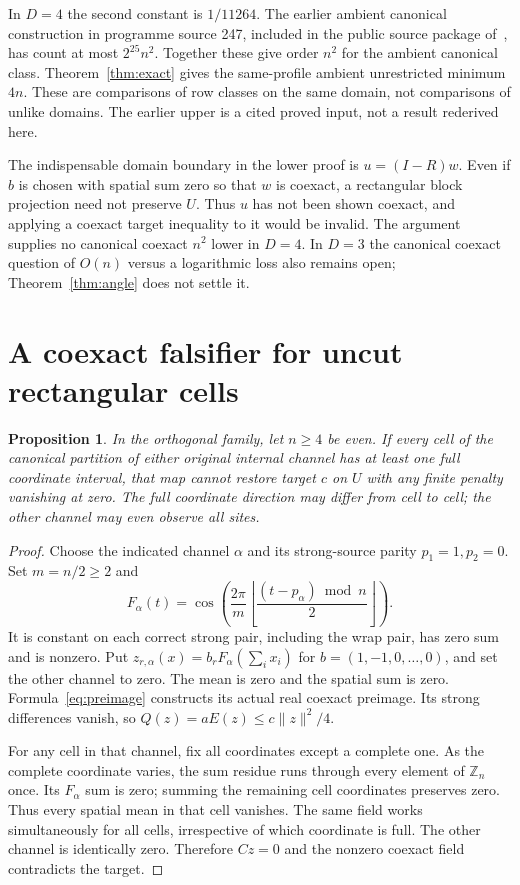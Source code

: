 \documentclass[11pt,a4paper]{article}
\newtheorem{proposition}[theorem]{Proposition}
\newcommand{\Z}{\mathbb Z}
\newcommand{\norm}[1]{\lVert#1\rVert}
\begin{document}
In $D=4$ the second constant is $1/11264$. The earlier ambient canonical
construction in programme source 247, included in the public source package
of~\cite{eriksson250}, has count at most $2^{25}n^2$. Together these give
order $n^2$ for the ambient canonical class. Theorem~\ref{thm:exact} gives
the same-profile ambient unrestricted minimum $4n$. These are comparisons
of row classes on the same domain, not comparisons of unlike domains.
The earlier upper is a cited proved input, not a result rederived here.

The indispensable domain boundary in the lower proof is $u=(I-R)w$.
Even if $b$ is chosen with spatial sum zero so that $w$ is coexact, a
rectangular block projection need not preserve $U$. Thus $u$ has not been
shown coexact, and applying a coexact target inequality to it would be
invalid. The argument supplies no canonical coexact $n^2$ lower in $D=4$.
In $D=3$ the canonical coexact question of $O(n)$ versus a logarithmic loss
also remains open; Theorem~\ref{thm:angle} does not settle it.

\section{A coexact falsifier for uncut rectangular cells}
\begin{proposition}\label{prop:uncut}
In the orthogonal family, let $n\geq4$ be even. If every cell of the
canonical partition of either original internal channel has at least one
full coordinate interval, that map cannot restore target $c$ on $U$ with
any finite penalty vanishing at zero. The full coordinate direction may
differ from cell to cell; the other channel may even observe all sites.
\end{proposition}
\begin{proof}
Choose the indicated channel $\alpha$ and its strong-source parity
$p_1=1,p_2=0$. Set $m=n/2\geq2$ and
\[
 F_\alpha(t)=\cos\left(\frac{2\pi}{m}
 \left\lfloor\frac{(t-p_\alpha)\bmod n}{2}\right\rfloor\right).
\]
It is constant on each correct strong pair, including the wrap pair, has
zero sum and is nonzero. Put
$z_{r,\alpha}(x)=b_rF_\alpha(\sum_i x_i)$ for
$b=(1,-1,0,\ldots,0)$, and set the other channel to zero.
The mean is zero and the spatial sum is zero. Formula~\eqref{eq:preimage}
constructs its actual real coexact preimage. Its strong differences vanish,
so $Q(z)=aE(z)\leq c\norm z^2/4$.

For any cell in that channel, fix all coordinates except a complete one.
As the complete coordinate varies, the sum residue runs through every
element of $\Z_n$ once. Its $F_\alpha$ sum is zero; summing the remaining
cell coordinates preserves zero. Thus every spatial mean in that cell
vanishes. The same field works simultaneously for all cells, irrespective
of which coordinate is full. The other channel is identically zero.
Therefore $Cz=0$ and the nonzero coexact field contradicts the target.
\end{proof}
\end{document}
